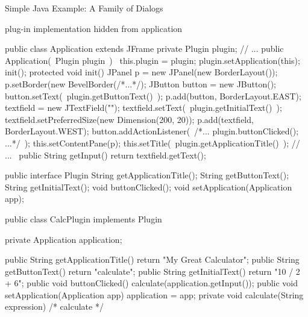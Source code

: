\begin{frame}[fragile]{Simple Java Example: A Family of Dialogs}
	\vspace{-2mm}
	\begin{fancycolumns}
		\begin{note}{}
			plug-in implementation hidden from application
		\end{note}
\begin{codetight}[basicstyle=\tiny]{}
public class Application extends JFrame {
	private Plugin plugin;
	// ...
	public Application(~Plugin plugin~) {
		~this.plugin = plugin;
		plugin.setApplication(this);~
		init();
	}
	protected void init() {
		JPanel p = new JPanel(new BorderLayout());
		p.setBorder(new BevelBorder(/*...*/);
		JButton button = new JButton();
		button.setText(~plugin.getButtonText()~);
		p.add(button, BorderLayout.EAST);
		textfield = new JTextField("");
		textfield.setText(~plugin.getInitialText()~);
		textfield.setPreferredSize(new Dimension(200, 20));
		p.add(textfield, BorderLayout.WEST);		
		button.addActionListener(~/*... plugin.buttonClicked(); ...*/~);
		this.setContentPane(p);		
		this.setTitle(~plugin.getApplicationTitle()~);
		// ...
	}
	~public String getInput() {
		return textfield.getText();
	}~
}
\end{codetight}
		\nextcolumn
{
\begin{codetight}[basicstyle=\tiny]{}
public interface Plugin {
	String getApplicationTitle();
	String getButtonText();
	String getInitialText();
	void buttonClicked();
	void setApplication(Application app);
}
\end{codetight}
\begin{codetight}[basicstyle=\tiny]{}
public class CalcPlugin implements Plugin {
	private Application application;

	public String getApplicationTitle() {
		return "My Great Calculator";
	}
	public String getButtonText() {
		return "calculate";
	}
	public String getInitialText() {
		return "10 / 2 + 6";
	}
	public void buttonClicked() {
		calculate(application.getInput());
	}
	public void setApplication(Application app) {
		application = app;
	}
	private void calculate(String expression) {
		/* calculate */
	}
}
\end{codetight}
}
	\end{fancycolumns}
\end{frame}

